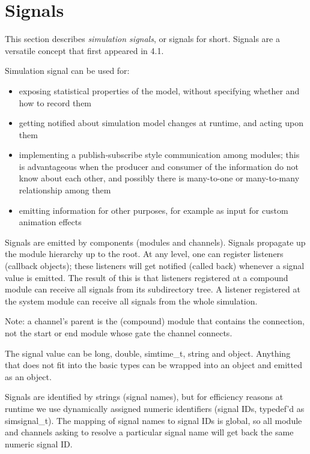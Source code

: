 
\section{Signals}
\label{sec:simple-modules:signals}

This section describes \textit{simulation signals}, or signals for short.
Signals are a versatile concept that first appeared in {\opp} 4.1.

Simulation signal can be used for:

\begin{itemize}
  \item{exposing statistical properties of the model, without specifying
        whether and how to record them}
  \item{getting notified about simulation model changes at runtime, and
        acting upon them}
  \item{implementing a publish-subscribe style communication among modules;
        this is advantageous when the producer and consumer of the information
        do not know about each other, and possibly there is many-to-one or
        many-to-many relationship among them}
  \item{emitting information for other purposes, for example as input for
        custom animation effects}
\end{itemize}

Signals are emitted by components (modules and channels). Signals propagate
up the module hierarchy up to the root. At any level, one can register
listeners (callback objects); these listeners will get notified (called back)
whenever a signal value is emitted. The result of this is that listeners
registered at a compound module can receive all signals from its subdirectory
tree. A listener registered at the system module can receive all signals from
the whole simulation.

Note: a channel's parent is the (compound) module that contains the connection,
not the start or end module whose gate the channel connects.

The signal value can be long, double, simtime_t, string and object. Anything
that does not fit into the basic types can be wrapped into an object
and emitted as an object.

Signals are identified by strings (signal names), but for efficiency reasons
at runtime we use dynamically assigned numeric identifiers (signal IDs,
typedef'd as simsignal_t). The mapping of signal names to signal IDs is
global, so all module and channels asking to resolve a particular signal name
will get back the same numeric signal ID.

